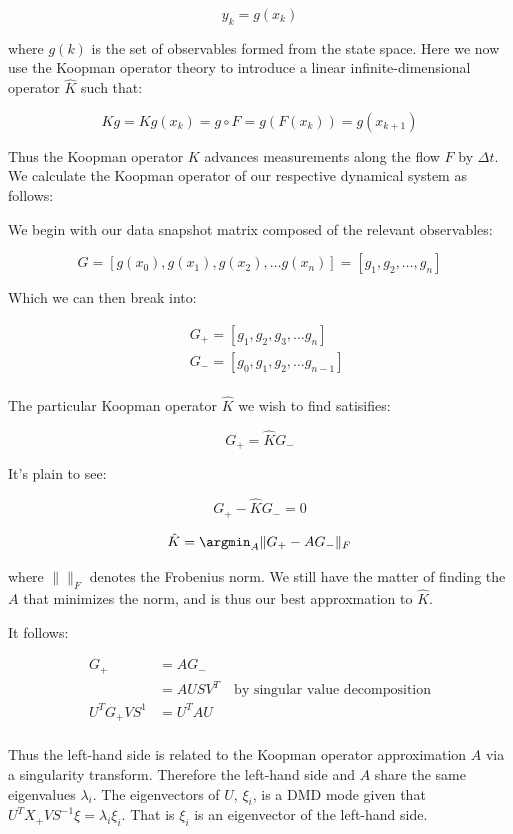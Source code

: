 $$
y_k = g(x_k)
$$

where $g(k)$ is the set of observables formed from the state space. 
Here we now use the Koopman operator theory to introduce a
 linear infinite-dimensional operator ${\hat K }$ such that:

$$
K g = K g(x_k) =g \circ F = g(F(x_k)) = g(x_{k+1})
$$

Thus the Koopman operator $K$ advances measurements along the flow $F$ by $\Delta t$.
We calculate the Koopman operator of our respective dynamical system as follows:

We begin with our data snapshot matrix composed of the relevant observables:

$$
G = [g(x_0), g(x_1), g(x_2), \dots g(x_n)] = [g_1,g_2,\dots, g_n]
$$

Which we can then break into:

\begin{align*}
    & G_+ = [g_1, g_2, g_3, \dots g_n]\\
    & G_- = [g_0, g_1, g_2, \dots g_{n-1}]\\\
\end{align*}


The particular Koopman operator ${\hat K }$ we wish to find satisifies:

$$
G_+ = {\hat K}G_-
$$

It's plain to see:

$$
G_+ - {\hat K}G_- = 0
$$

$$
{\hat K } = {\argmin_{A}} \|G_+ - {A}G_- \|_{F}
$$

where $\| \|_{F}$ denotes the Frobenius norm. We still have the matter of finding the 
$A$ that minimizes the norm, and is thus our best approxmation to ${\hat K}$. 

It follows:

\begin{align*}
    G_+ &= AG_- \\
    &= AUSV^{T} \quad \text{by singular value decomposition} \\ 
U^T G_+ V S^{1} &= U^T A U \\
\end{align*}

Thus the left-hand side is related to the Koopman operator approximation $A$ via a singularity transform. Therefore the 
left-hand side and $A$ share the same eigenvalues $\lambda_i$. The eigenvectors of $U$, $\xi_i$, is a DMD mode given that
$U^T X_+ V S^{-1} \xi = \lambda_i \xi_i$. That is $\xi_i$ is an eigenvector of the left-hand side. \cite{chris}


